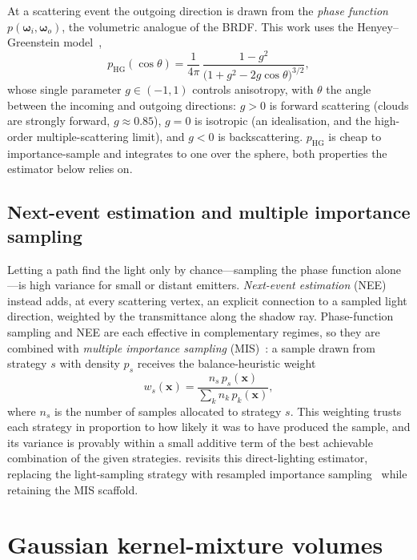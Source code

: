 At a scattering event the outgoing direction is drawn from the \emph{phase function}
$p(\bm{\omega}_i,\bm{\omega}_o)$, the volumetric analogue of the BRDF. This work uses the
Henyey--Greenstein model~\cite{HenyeyGreenstein1941},
\[
  p_{\mathrm{HG}}(\cos\theta) =
  \frac{1}{4\pi}\,\frac{1-g^{2}}{\big(1+g^{2}-2g\cos\theta\big)^{3/2}},
\]
whose single parameter $g\in(-1,1)$ controls anisotropy, with $\theta$ the angle between the incoming
and outgoing directions: $g>0$ is forward scattering (clouds are strongly forward, $g\approx 0.85$),
$g=0$ is isotropic (an idealisation, and the high-order multiple-scattering limit), and $g<0$ is
backscattering. $p_{\mathrm{HG}}$ is
cheap to importance-sample and integrates to one over the sphere, both properties the estimator
below relies on.

\subsection{Next-event estimation and multiple importance sampling}

Letting a path find the light only by chance---sampling the phase function alone---is high variance
for small or distant emitters. \emph{Next-event estimation} (NEE) instead adds, at every scattering
vertex, an explicit connection to a sampled light direction, weighted by the transmittance along the
shadow ray. Phase-function sampling and NEE are each effective in complementary regimes, so they are
combined with \emph{multiple importance sampling} (MIS)~\cite{VeachGuibas1995}: a sample drawn from
strategy $s$ with density $p_s$ receives the balance-heuristic weight
\[
  w_s(\bm{x}) = \frac{n_s\,p_s(\bm{x})}{\sum_k n_k\,p_k(\bm{x})},
\]
where $n_s$ is the number of samples allocated to strategy $s$. This weighting trusts each strategy in
proportion to how likely it was to have produced the sample, and its variance is provably within a
small additive term of the best achievable combination of the given strategies.
 revisits this direct-lighting estimator, replacing the light-sampling
strategy with resampled importance sampling~\cite{Talbot2005} while retaining the MIS scaffold.

\section{Gaussian kernel-mixture volumes}
\label{sec:kernel-mixture}

